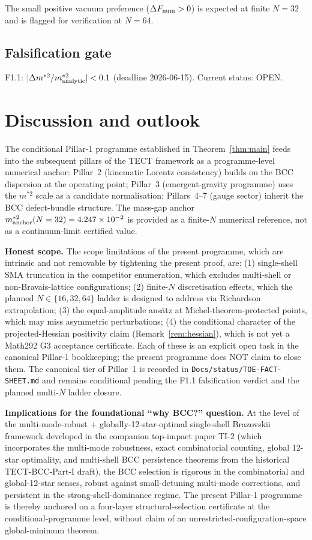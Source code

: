The small positive vacuum preference ($\Delta F_{\rm num} > 0$) is expected at
finite $N = 32$ and is flagged for verification at $N = 64$.

\subsection{Falsification gate}

F1.1: $|\Delta m^{*2}/m^{*2}_{\rm analytic}| < 0.1$ (deadline 2026-06-15).
Current status: OPEN.

\section{Discussion and outlook}
The conditional Pillar-1 programme established in
Theorem~\ref{thm:main} feeds into the subsequent pillars of the TECT
framework as a programme-level numerical anchor: Pillar~2 (kinematic
Lorentz consistency) builds on the BCC dispersion at the operating
point; Pillar~3 (emergent-gravity programme) uses the $m^{*2}$ scale
as a candidate normalisation; Pillars~4--7 (gauge sector) inherit
the BCC defect-bundle structure. The mass-gap anchor
$m^{*2}_{\rm anchor}(N=32) = 4.247 \times 10^{-2}$ is provided as a
finite-$N$ numerical reference, not as a continuum-limit certified
value.

\textbf{Honest scope.} The scope limitations of the present
programme, which are intrinsic and not removable by tightening the
present proof, are: (1) single-shell SMA truncation in the
competitor enumeration, which excludes multi-shell or
non-Bravais-lattice configurations; (2) finite-$N$ discretisation
effects, which the planned $N \in \{16, 32, 64\}$ ladder is
designed to address via Richardson extrapolation; (3) the
equal-amplitude ans\"atz at Michel-theorem-protected points, which
may miss asymmetric perturbations; (4) the conditional character of
the projected-Hessian positivity claim (Remark~\ref{rem:hessian}),
which is not yet a Math292 G3 acceptance certificate. Each of these
is an explicit open task in the canonical Pillar-1 bookkeeping; the
present programme does NOT claim to close them. The canonical tier
of Pillar~1 is recorded in
\texttt{Docs/status/TOE-FACT-SHEET.md} and remains conditional
pending the F1.1 falsification verdict and the planned multi-$N$
ladder closure.

\textbf{Implications for the foundational ``why BCC?'' question.}
At the level of the multi-mode-robust + globally-12-star-optimal
single-shell Brazovskii framework developed in the companion
top-impact paper TI-2 (which incorporates the multi-mode robustness,
exact combinatorial counting, global 12-star optimality, and
multi-shell BCC persistence theorems from the historical TECT-BCC-Part-I
draft), the BCC selection is rigorous in the combinatorial and
global-12-star senses, robust against small-detuning multi-mode
corrections, and persistent in the strong-shell-dominance regime.
The present Pillar-1 programme is thereby anchored on a four-layer
structural-selection certificate at the conditional-programme level,
without claim of an unrestricted-configuration-space global-minimum
theorem.

